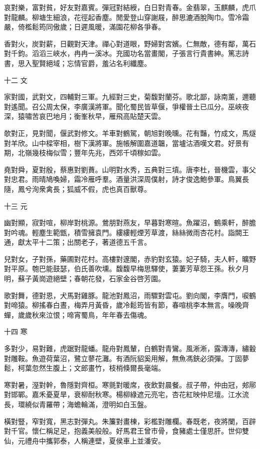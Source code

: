 \documentclass[12pt,a4paper]{ctexbook}
\begin{document}
哀對樂，富對貧，好友對嘉賓。彈冠對結綬，白日對青春。金翡翠，玉麒麟，虎爪對龍麟。柳塘生細浪，花徑起香塵。閒愛登山穿謝屐，醉思漉酒脫陶巾。雪冷霜嚴，倚檻鬆筠同傲歲；日遲風暖，滿園花柳各爭春。\par
香對火，炭對薪，日觀對天津。禪心對道眼，野婦對宮嬪。仁無敵，德有鄰，萬石對千鈞。滔滔三峽水，冉冉一溪冰。充國功名當畫閣，子張言行貴書紳。篤志詩書，思入聖賢絕域；忘情官爵，羞沾名利纖塵。\par
十二 文\par
家對國，武對文，四輔對三軍。九經對三史，菊馥對蘭芬。歌北鄙，詠南薰，邇聽對遙聞。召公周太保，李廣漢將軍。聞化蜀民皆草偃，爭權晉土已瓜分。巫峽夜深，猿嘯苦哀巴地月；衡峯秋早，雁飛高貼楚天雲。\par
欹對正，見對聞，偃武對修文。羊車對鶴駕，朝旭對晚曛。花有豔，竹成文，馬燧對羊欣。山中樑宰相，樹下漢將軍。施帳解圍嘉道韞，當壚沽酒嘆文君。好景有期，北嶺幾枝梅似雪；豐年先兆，西郊千頃稼如雲。\par
堯對舜，夏對殷，蔡惠對劉蕡。山明對水秀，五典對三墳。唐李杜，晉機雲，事父對忠君。雨晴鳩喚婦，霜冷雁呼羣。酒量洪深周僕射，詩才俊逸鮑參軍。鳥翼長隨，鳳兮洵衆禽長；狐威不假，虎也真百獸尊。\par
十三 元\par
幽對顯，寂對喧，柳岸對桃源。鶯朋對燕友，早暮對寒暄。魚躍沼，鶴乘軒，醉膽對吟魂。輕塵生範甑，積雪擁袁門。縷縷輕煙芳草渡，絲絲微雨杏花村。詣闕王通，獻太平十二策；出關老子，著道德五千言。\par
兒對女，子對孫，藥圃對花村。高樓對邃閣，赤豹對玄猿。妃子騎，夫人軒，曠野對平原。匏巴能鼓瑟，伯氏善吹壎。馥馥早梅思驛使，萋萋芳草怨王孫。秋夕月明，蘇子黃崗遊絕壁；春朝花發，石家金谷啓芳園。\par
歌對舞，德對恩，犬馬對雞豚。龍池對鳳沼，雨驟對雲屯。劉向閣，李膺門，唳鶴對啼猿。柳搖春白晝，梅弄月黃昏，歲冷鬆筠皆有節，春喧桃李本無言。噪晚齊蟬，歲歲秋來泣恨；啼宵蜀鳥，年年春去傷魂。\par
十四 寒\par
多對少，易對難，虎踞對龍蟠。龍舟對鳳輦，白鶴對青鸞。風淅淅，露漙漙，繡轂對雕鞍。魚遊荷葉沼，鷺立蓼花灘。有酒阮貂奚用解，無魚馮鋏必須彈。丁固夢鬆，柯葉忽然生腹上；文郎畫竹，枝梢倏爾長毫端。\par
寒對暑，溼對幹，魯隱對齊桓。寒氈對暖席，夜飲對晨餐。叔子帶，仲由冠，郟鄏對邯鄲。嘉禾憂夏旱，衰柳耐秋寒。楊柳綠遮元亮宅，杏花紅映仲尼壇。江水流長，環繞似青羅帶；海蟾輪滿，澄明如白玉盤。\par
橫對豎，窄對寬，黑志對彈丸。朱簾對畫棟，彩檻對雕欄。春既老，夜將闌，百辟對千官。懷仁稱足足，抱義美般般。好馬君王曾市骨，食豬處士僅思肝。世仰雙仙，元禮舟中攜郭泰，人稱連壁，夏侯車上並潘安。\par
\end{document}
